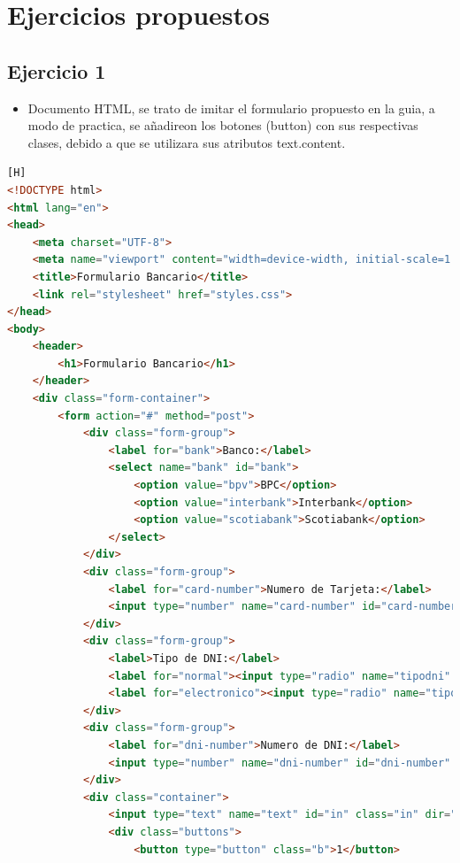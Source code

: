 \documentclass{article}
\begin{document}
	\section{Ejercicios propuestos}
	
	\subsection{Ejercicio 1}
	\begin{itemize}	
		\item Documento HTML, se trato de imitar el formulario propuesto en la guia, a modo de practica, se añadireon los botones (button) con sus respectivas clases, debido a que se utilizara sus atributos text.content.
	\end{itemize}	
		
	\begin{lstlisting}[language=html,caption={Ejercicio1/index.html}][H]
<!DOCTYPE html>
<html lang="en">
<head>
    <meta charset="UTF-8">
    <meta name="viewport" content="width=device-width, initial-scale=1.0">
    <title>Formulario Bancario</title>
    <link rel="stylesheet" href="styles.css">
</head>
<body>
    <header>
        <h1>Formulario Bancario</h1>
    </header>
    <div class="form-container">
        <form action="#" method="post">
            <div class="form-group">
                <label for="bank">Banco:</label>
                <select name="bank" id="bank">
                    <option value="bpv">BPC</option>
                    <option value="interbank">Interbank</option>
                    <option value="scotiabank">Scotiabank</option>
                </select>
            </div>
            <div class="form-group">
                <label for="card-number">Numero de Tarjeta:</label>
                <input type="number" name="card-number" id="card-number" required>
            </div>
            <div class="form-group">
                <label>Tipo de DNI:</label>
                <label for="normal"><input type="radio" name="tipodni" id="normal" value="normal" checked> Normal</label>
                <label for="electronico"><input type="radio" name="tipodni" id="electronico" value="electronico"> Electronico</label>
            </div>
            <div class="form-group">
                <label for="dni-number">Numero de DNI:</label>
                <input type="number" name="dni-number" id="dni-number" required>
            </div>
            <div class="container">
                <input type="text" name="text" id="in" class="in" dir="rtl">
                <div class="buttons">
                    <button type="button" class="b">1</button>

\end{lstlisting}
\end{document}
